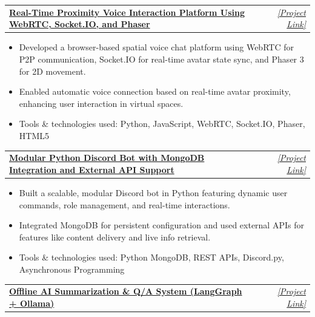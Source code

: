 \documentclass[a4paper,11pt]{article}
\makeatletter
\newcommand{\resumeProjectCompact}[2]{
  \vspace{0.5mm}\item
    \begin{tabular*}{0.98\textwidth}[t]{l@{\extracolsep{\fill}}r}
        \textbf{#1} & \textit{\footnotesize{#2}} \\
    \end{tabular*}
    \vspace{-2.4mm}
}
\newcommand{\resumeItemListStart}{\begin{justify}\begin{itemize}[leftmargin=3ex, rightmargin=2ex, noitemsep,labelsep=1.2mm,itemsep=0mm]\small}
\newcommand{\resumeItemListEnd}{\end{itemize}\end{justify}\vspace{-2mm}}
\makeatother
\begin{document}
        \resumeProjectCompact
            {\href{https://vigneshta.com/projects/chatopia}{ Real-Time Proximity Voice Interaction Platform Using WebRTC, Socket.IO, and Phaser}} %
            {\href{https://vigneshta.com/projects/chatopia}{[Project Link]}}
        
            \resumeItemListStart
                \item {Developed a browser-based spatial voice chat platform using WebRTC for P2P communication, Socket.IO for real-time avatar state sync, and Phaser 3 for 2D movement.}
                \item {Enabled automatic voice connection based on real-time avatar proximity, enhancing user interaction in virtual spaces.}
                \item {Tools \& technologies used: Python, JavaScript, WebRTC, Socket.IO, Phaser, HTML5}
            \resumeItemListEnd
        \vspace{-3mm}
        \resumeProjectCompact
            {\href{https://vigneshta.com/projects/discord-bot}{ Modular Python Discord Bot with MongoDB Integration and External API Support}} %
            {\href{https://vigneshta.com/projects/discord-bot}{[Project Link]}}
        
            \resumeItemListStart
                \item {Built a scalable, modular Discord bot in Python featuring dynamic user commands, role management, and real-time interactions.}
                \item {Integrated MongoDB for persistent configuration and used external APIs for features like content delivery and live info retrieval.}
                \item {Tools \& technologies used: Python MongoDB, REST APIs, Discord.py, Asynchronous Programming}
            \resumeItemListEnd
            \vspace{-3mm}

        \resumeProjectCompact
            {\href{https://vigneshta.com/projects/agentic-ai}{ Offline AI Summarization \& Q/A System (LangGraph + Ollama)}} %
            {\href{https://vigneshta.com/projects/agentic-ai}{[Project Link]}}
        
\end{document}
